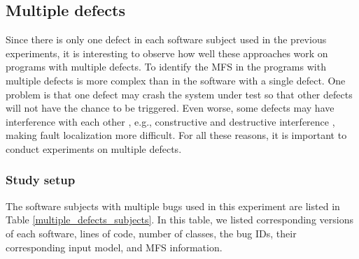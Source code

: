 \documentclass[journal,12pt,onecolumn,draftclsnofoot,]{IEEEtran}
\begin{document}
%
%
%


\subsection{Multiple defects}
Since there is only one defect in each software subject used in the previous experiments, it is interesting to observe how well these approaches work on programs with multiple defects. To identify the MFS in the programs with multiple defects is more complex than in the software with a single defect. One problem is that one defect may crash the system under test so that other defects will not have the chance to be triggered. Even worse, some defects may have interference with each other \cite{wong2016survey}, e.g., constructive and destructive interference \cite{debroy2009insights}, making fault localization more difficult.  For all these reasons, it is important to conduct experiments on multiple defects.

\subsubsection{Study setup}
The software subjects with multiple bugs used in this experiment are listed in Table \ref{multiple_defects_subjects}. In this table, we listed corresponding versions of each software, lines of code, number of classes, the bug IDs, their corresponding input model, and MFS information.
\end{document}
